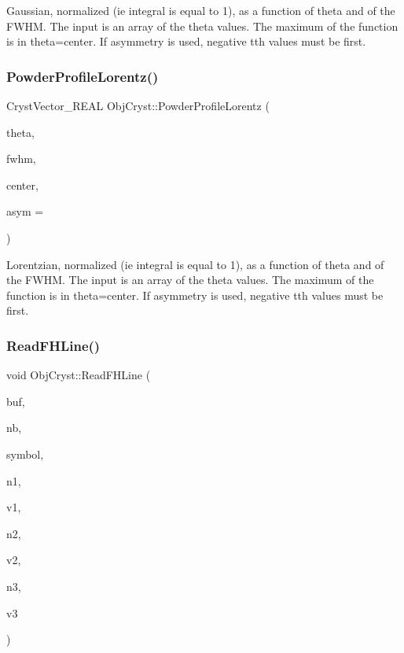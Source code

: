 Gaussian, normalized (ie integral is equal to 1), as a function of theta and of the F\+W\+HM. The input is an array of the theta values. The maximum of the function is in theta=center. If asymmetry is used, negative tth values must be first. \mbox{\label{namespace_obj_cryst_a1fa89883fa49bb02665e4e9d1c85495b}} 
\subsubsection{\texorpdfstring{PowderProfileLorentz()}{PowderProfileLorentz()}}
{\footnotesize\ttfamily Cryst\+Vector\+\_\+\+R\+E\+AL Obj\+Cryst\+::\+Powder\+Profile\+Lorentz (\begin{DoxyParamCaption}\item[{const Cryst\+Vector\+\_\+\+R\+E\+AL}]{theta,  }\item[{const R\+E\+AL}]{fwhm,  }\item[{const R\+E\+AL}]{center,  }\item[{const R\+E\+AL}]{asym = {} }\end{DoxyParamCaption})}

Lorentzian, normalized (ie integral is equal to 1), as a function of theta and of the F\+W\+HM. The input is an array of the theta values. The maximum of the function is in theta=center. If asymmetry is used, negative tth values must be first. \mbox{\label{namespace_obj_cryst_a36ff196370e39131e82f33eb55306c6d}} 
\subsubsection{\texorpdfstring{ReadFHLine()}{ReadFHLine()}}
{\footnotesize\ttfamily void Obj\+Cryst\+::\+Read\+F\+H\+Line (\begin{DoxyParamCaption}\item[{const char $\ast$}]{buf,  }\item[{const unsigned int}]{nb,  }\item[{string \&}]{symbol,  }\item[{int \&}]{n1,  }\item[{float \&}]{v1,  }\item[{int \&}]{n2,  }\item[{float \&}]{v2,  }\item[{int \&}]{n3,  }\item[{float \&}]{v3 }\end{DoxyParamCaption})}

